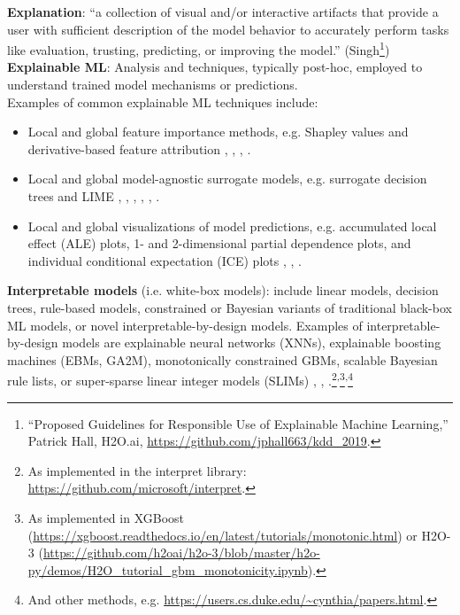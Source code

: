 \documentclass[sigconf]{acmart}
\begin{document}
\vspace{-8pt}
\noindent\textbf{Explanation}: ``a collection of visual and/or interactive artifacts that provide a user with sufficient description of the model behavior to accurately perform tasks like evaluation, trusting, predicting, or improving the model.'' (Singh\footnote{``Proposed Guidelines for Responsible Use of Explainable Machine Learning,'' Patrick Hall, H2O.ai, \url{https://github.com/jphall663/kdd_2019}.})\\

\vspace{-8pt}
\noindent\textbf{Explainable ML}:  Analysis and techniques, typically post-hoc, employed to understand trained model mechanisms or predictions.\\

\vspace{-8pt}
\noindent Examples of common explainable ML techniques include:
\begin{itemize}
\item Local and global feature importance methods, e.g. Shapley values and derivative-based feature attribution \cite{grad_attr} \cite{keinan2004fair}, \cite{shapley}, \cite{shapley1988shapley}, \cite{kononenko2010efficient}.
\item Local and global model-agnostic surrogate models, e.g. surrogate decision trees and LIME \cite{dt_surrogate2}, \cite{viper}, \cite{dt_surrogate1}, \cite{lime-sup}, \cite{lime}, \cite{wf_xnn}. 
\item Local and global visualizations of model predictions, e.g. accumulated local effect (ALE) plots, 1- and 2-dimensional partial dependence plots, and individual conditional expectation (ICE) plots \cite{ale_plot}, \cite{esl}, \cite{ice_plots}.
\end{itemize}  

\noindent\textbf{Interpretable models} (i.e. white-box models): include linear models, decision trees, rule-based models, constrained or Bayesian variants of traditional black-box ML models, or novel interpretable-by-design models. Examples of interpretable-by-design models are explainable neural networks (XNNs), explainable boosting machines (EBMs, GA2M), monotonically constrained GBMs, scalable Bayesian rule lists, or super-sparse linear integer models (SLIMs) \cite{slim}, \cite{wf_xnn}, \cite{sbrl}.\footnote{As implemented in the interpret library: \url{https://github.com/microsoft/interpret}.}\textsuperscript{,}\footnote{As implemented in XGBoost (\url{https://xgboost.readthedocs.io/en/latest/tutorials/monotonic.html}) or H2O-3 (\url{https://github.com/h2oai/h2o-3/blob/master/h2o-py/demos/H2O_tutorial_gbm_monotonicity.ipynb}).}\textsuperscript{,}\footnote{And other methods, e.g. \url{https://users.cs.duke.edu/~cynthia/papers.html}.}\\
\end{document}
